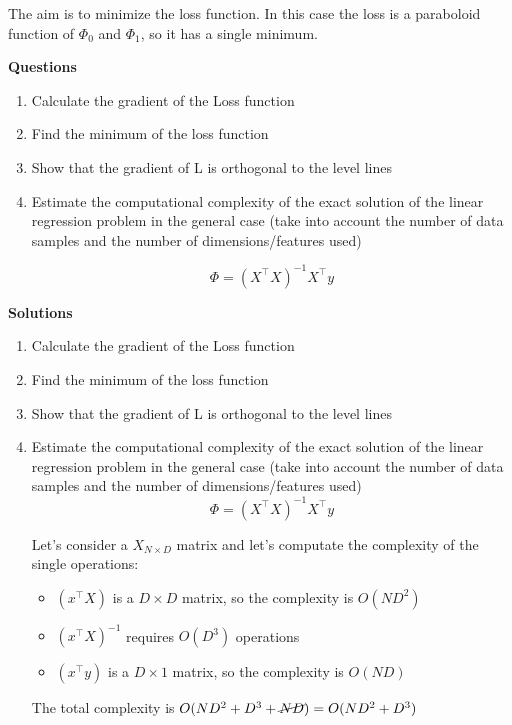 The aim is to minimize the loss function. In this case the loss is a paraboloid function of $\Phi_0$ and $\Phi_1$, so it has a single minimum. 

\textbf{Questions}

\begin{enumerate}
    \item Calculate the gradient of the Loss function
    \item Find the minimum of the loss function
    \item Show that the gradient of L is orthogonal to the level lines
    \item Estimate the computational complexity of the exact solution of the linear regression problem in the general case (take into account the number of data samples and the number of dimensions/features used)
    
    $$
    \Phi = (X^\top X)^{-1} X^\top y
    $$
\end{enumerate}

\textbf{Solutions}

\begin{enumerate}
    \item Calculate the gradient of the Loss function
    \item Find the minimum of the loss function
    \item Show that the gradient of L is orthogonal to the level lines
    \item Estimate the computational complexity of the exact solution of the linear regression problem in the general case (take into account the number of data samples and the number of dimensions/features used)
    $$
    \Phi = (X^\top X)^{-1} X^\top y
    $$

    Let's consider a $X_{N\times D}$ matrix and let's computate the complexity of the single operations:

    \begin{itemize}
        \item $(x^\top X)$ is a $D \times D$ matrix, so the complexity is $O(ND^2)$
        \item $(x^\top X)^{-1}$ requires $O(D^3)$ operations
        \item $(x^\top y)$ is a $D \times 1$ matrix, so the complexity is $O(ND)$
    \end{itemize}

    The total complexity is $O(ND^2 + D^3 + \cancel{ND}) = O(ND^2 + D^3)$
\end{enumerate}